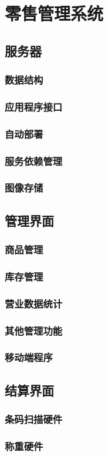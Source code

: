 \newpage
\section{零售管理系统}
\label{sec:foundation}

\subsection{服务器}

\subsubsection{数据结构}

\subsubsection{应用程序接口}

\subsubsection{自动部署}

\subsubsection{服务依赖管理}

\subsubsection{图像存储}

\subsection{管理界面}

\subsubsection{商品管理}

\subsubsection{库存管理}

\subsubsection{营业数据统计}

\subsubsection{其他管理功能}

\subsubsection{移动端程序}

\subsection{结算界面}

\subsubsection{条码扫描硬件}

\subsubsection{称重硬件}